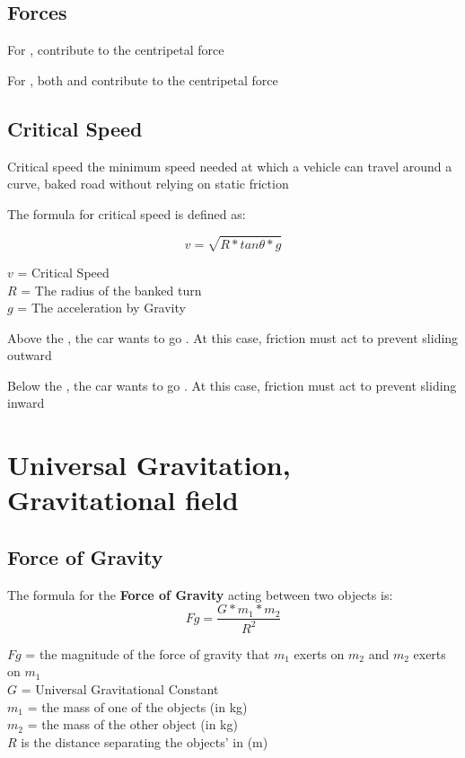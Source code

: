 \subsection{Forces}
For ,  contribute to the centripetal force

For , both  and  contribute to the centripetal force

\subsection{Critical Speed}
\begin{definition}
    Critical speed the minimum speed needed at which a vehicle can travel around a curve, baked road without relying on static friction
\end{definition}

The formula for critical speed is defined as:
\begin{cyanblock}
    \[
        v = \sqrt{R*tan\theta *g}
    \]
    \begin{center}
        $v$ = Critical Speed\\
        $R$ = The radius of the banked turn\\
        $g$ = The acceleration by Gravity\\
    \end{center}
\end{cyanblock}

Above the , the car wants to go . At this case, friction must act  to prevent sliding outward

Below the , the car wants to go . At this case, friction must act  to prevent sliding inward

\section{Universal Gravitation, Gravitational field}
\subsection{Force of Gravity}
The formula for the \textbf{Force of Gravity} acting between two objects is:
\[
    Fg = \frac{G * m_{1} * m_{2}}{R^2}
\]
\begin{center}
    $Fg$ = the magnitude of the force of gravity that $m_{1}$ exerts on $m_{2}$ and $m_{2}$ exerts on $m_{1}$\\
    $G$ = Universal Gravitational Constant\\
    $m_{1}$ = the mass of one of the objects (in kg)\\
    $m_{2}$ = the mass of the other object (in kg)\\
    $R$ is the distance separating the objects'  in (m)
\end{center}

